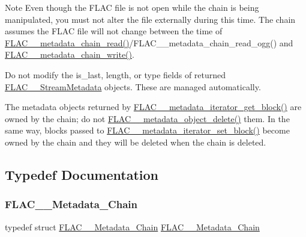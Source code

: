 \begin{DoxyNote}{Note}
Even though the F\+L\+AC file is not open while the chain is being manipulated, you must not alter the file externally during this time. The chain assumes the F\+L\+AC file will not change between the time of \mbox{\hyperlink{group__flac__metadata__level2_gadb7d8e9a82aeb43e256f0a948adf5c45}{F\+L\+A\+C\+\_\+\+\_\+metadata\+\_\+chain\+\_\+read()}}/\+F\+L\+A\+C\+\_\+\+\_\+metadata\+\_\+chain\+\_\+read\+\_\+ogg() and \mbox{\hyperlink{group__flac__metadata__level2_gaa15ead7230217de8e79f4af822cda490}{F\+L\+A\+C\+\_\+\+\_\+metadata\+\_\+chain\+\_\+write()}}.

Do not modify the is\+\_\+last, length, or type fields of returned \mbox{\hyperlink{struct_f_l_a_c_____stream_metadata}{F\+L\+A\+C\+\_\+\+\_\+\+Stream\+Metadata}} objects. These are managed automatically.

The metadata objects returned by \mbox{\hyperlink{group__flac__metadata__level2_ga4a2b00a4312d178a9f55c2e2f8b08904}{F\+L\+A\+C\+\_\+\+\_\+metadata\+\_\+iterator\+\_\+get\+\_\+block()}} are owned by the chain; do not \mbox{\hyperlink{group__flac__metadata__object_ga66bbe27dba68ba77be5af83986a280ea}{F\+L\+A\+C\+\_\+\+\_\+metadata\+\_\+object\+\_\+delete()}} them. In the same way, blocks passed to \mbox{\hyperlink{group__flac__metadata__level2_gab40c33a0bf35a2932a5c13f5230e0d9e}{F\+L\+A\+C\+\_\+\+\_\+metadata\+\_\+iterator\+\_\+set\+\_\+block()}} become owned by the chain and they will be deleted when the chain is deleted. 
\end{DoxyNote}


\subsection{Typedef Documentation}
\mbox{\label{group__flac__metadata__level2_gaec6993c60b88f222a52af86f8f47bfdf}} 
\subsubsection{\texorpdfstring{FLAC\_\_Metadata\_Chain}{FLAC\_\_Metadata\_Chain}}
{\footnotesize\ttfamily typedef struct \mbox{\hyperlink{group__flac__metadata__level2_gaec6993c60b88f222a52af86f8f47bfdf}{F\+L\+A\+C\+\_\+\+\_\+\+Metadata\+\_\+\+Chain}} \mbox{\hyperlink{group__flac__metadata__level2_gaec6993c60b88f222a52af86f8f47bfdf}{F\+L\+A\+C\+\_\+\+\_\+\+Metadata\+\_\+\+Chain}}}

